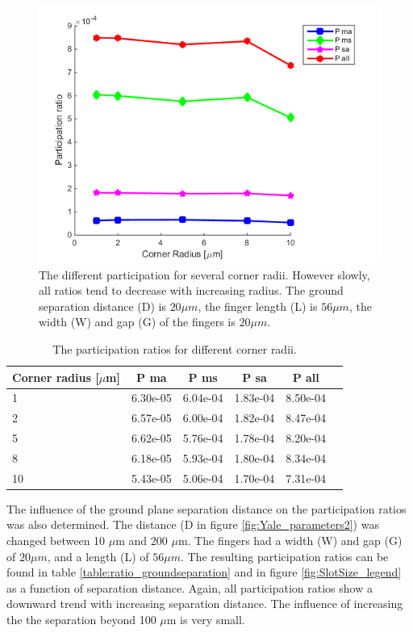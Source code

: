  \begin{figure}
 	\centering
 	\includegraphics[scale = 0.7]{Figures/Ratio_plots/CornerRadius_legend}
 	\caption{The different participation for several corner radii. However slowly, all ratios tend to decrease with increasing radius. The ground separation distance (D) is \(20\mu m\), the finger length (L) is \(56 \mu m\), the width (W) and gap (G) of the fingers is \(20 \mu m\).}
 	\label{fig:CornerRadius}
 \end{figure}

\begin{table}
	\begin{center}
		\begin{tabular}{ | l || c | c | c | c | c |}
			\hline
			Corner radius [\(\mu\)m] & P ma & P ms & P sa & P all \\ \hline
			1 & 6.30e-05 & 6.04e-04 & 1.83e-04 & 8.50e-04 \\
			2 & 6.57e-05 & 6.00e-04 & 1.82e-04 & 8.47e-04 \\
			5 & 6.62e-05 & 5.76e-04 & 1.78e-04 & 8.20e-04\\
			8 & 6.18e-05 & 5.93e-04 & 1.80e-04 & 8.34e-04\\
			10 & 5.43e-05 & 5.06e-04 & 1.70e-04 & 7.31e-04\\
			\hline
		\end{tabular}
	\end{center}
	\caption{The participation ratios for different corner radii.}
	\label{table:ratio_cornerradius}
\end{table}

The influence of the ground plane separation distance on the participation ratios was also determined. The distance (D in figure \ref{fig:Yale_parameters2}) was changed between 10 \(\mu\)m and 200 \(\mu\)m. The fingers had a width (W) and gap (G) of \(20 \mu m\), and a length (L) of \(56 \mu m\). The resulting participation ratios can be found in table \ref{table:ratio_groundseparation} and in figure \ref{fig:SlotSize_legend} as a function of separation distance. Again, all participation ratios show a downward trend with increasing separation distance. The influence of increasing the the separation beyond 100 \(\mu\)m is very small.

